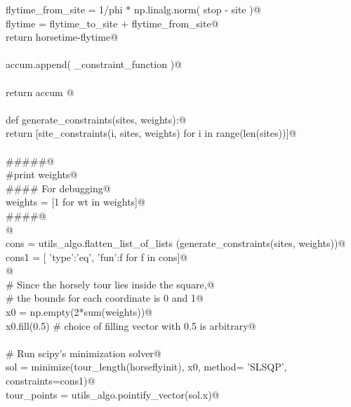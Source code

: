 \documentclass[11.5pt]{report}
\begin{document}
\begin{flushleft}
\begin{list}{}{}
\mbox{}\verb@                          flytime_from_site = 1/phi * np.linalg.norm( stop - site  )@\\
\mbox{}\verb@                          flytime           = flytime_to_site + flytime_from_site@\\
\mbox{}\verb@                          return horsetime-flytime@\\
\mbox{}\verb@@\\
\mbox{}\verb@                    accum.append( _constraint_function )@\\
\mbox{}\verb@@\\
\mbox{}\verb@          return accum @\\
\mbox{}\verb@@\\
\mbox{}\verb@     def generate_constraints(sites, weights):@\\
\mbox{}\verb@         return [site_constraints(i, sites, weights) for i in range(len(sites))]@\\
\mbox{}\verb@@\\
\mbox{}\verb@     #####@\\
\mbox{}\verb@     #print weights@\\
\mbox{}\verb@     #### For debugging@\\
\mbox{}\verb@     weights = [1 for wt in weights]@\\
\mbox{}\verb@     ####@\\
\mbox{}\verb@     @\\
\mbox{}\verb@     cons = utils_algo.flatten_list_of_lists (generate_constraints(sites, weights))@\\
\mbox{}\verb@     cons1 = [  {'type':'eq', 'fun':f}  for f in cons]@\\
\mbox{}\verb@     @\\
\mbox{}\verb@     # Since the horsely tour lies inside the square,@\\
\mbox{}\verb@     # the bounds for each coordinate is 0 and 1@\\
\mbox{}\verb@     x0 = np.empty(2*sum(weights))@\\
\mbox{}\verb@     x0.fill(0.5) # choice of filling vector with 0.5 is arbitrary@\\
\mbox{}\verb@@\\
\mbox{}\verb@     # Run scipy's minimization solver@\\
\mbox{}\verb@     sol = minimize(tour_length(horseflyinit), x0, method= 'SLSQP', constraints=cons1)@\\
\mbox{}\verb@     tour_points = utils_algo.pointify_vector(sol.x)@\\

\end{list}
\end{flushleft}
\end{document}
